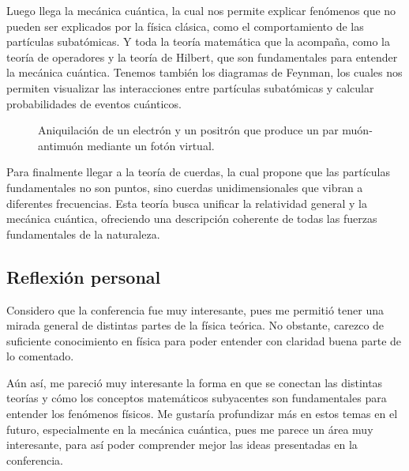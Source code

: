\documentclass[11pt]{article}
\begin{document}
    Luego llega la mecánica cuántica, la cual nos permite explicar fenómenos que no pueden ser explicados por la física clásica, como el comportamiento de las partículas subatómicas. Y toda la teoría matemática que la acompaña, como la teoría de operadores y la teoría de Hilbert, que son fundamentales para entender la mecánica cuántica. Tenemos también los diagramas de Feynman, los cuales nos permiten visualizar las interacciones entre partículas subatómicas y calcular probabilidades de eventos cuánticos.

    \begin{figure}[h!]
        \centering
        \caption{Aniquilación de un electrón y un positrón que produce un par muón-antimuón mediante un fotón virtual.}
    \end{figure}

    Para finalmente llegar a la teoría de cuerdas, la cual propone que las partículas fundamentales no son puntos, sino cuerdas unidimensionales que vibran a diferentes frecuencias. Esta teoría busca unificar la relatividad general y la mecánica cuántica, ofreciendo una descripción coherente de todas las fuerzas fundamentales de la naturaleza.

    \subsection{Reflexión personal}
    Considero que la conferencia fue muy interesante, pues me permitió tener una mirada general de distintas partes de la física teórica. No obstante, carezco de suficiente conocimiento en física para poder entender con claridad buena parte de lo comentado.

    Aún así, me pareció muy interesante la forma en que se conectan las distintas teorías y cómo los conceptos matemáticos subyacentes son fundamentales para entender los fenómenos físicos. Me gustaría profundizar más en estos temas en el futuro, especialmente en la mecánica cuántica, pues me parece un área muy interesante, para así poder comprender mejor las ideas presentadas en la conferencia.
\end{document}
